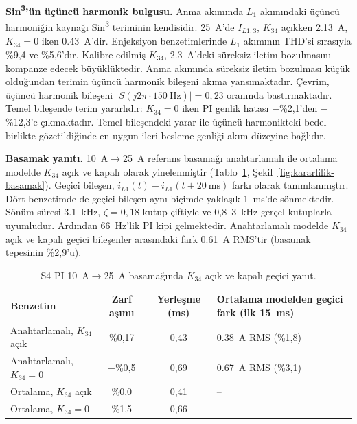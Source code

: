 \textbf{Sin\textsuperscript{3}'ün üçüncü harmonik bulgusu.} Anma akımında $L_1$ akımındaki üçüncü harmoniğin kaynağı Sin\textsuperscript{3} teriminin kendisidir. \SI{25}{\ampere}'de $I_{L1,3}$, $K_{34}$ açıkken \SI{2.13}{\ampere}, $K_{34}=0$ iken \SI{0.43}{\ampere}'dir. Enjeksiyon benzetimlerinde $L_1$ akımının THD'si sırasıyla \%9,4 ve \%5,6'dır. Kalibre edilmiş $K_{34}$, \SI{2.3}{\ampere}'deki süreksiz iletim bozulmasını kompanze edecek büyüklüktedir. Anma akımında süreksiz iletim bozulması küçük olduğundan terimin üçüncü harmonik bileşeni akıma yansımaktadır. Çevrim, üçüncü harmonik bileşeni $|S(j2\pi\cdot\SI{150}{\hertz})|=0{,}23$ oranında bastırmaktadır. Temel bileşende terim yararlıdır: $K_{34}=0$ iken PI genlik hatası $-$\%2,1'den $-$\%12,3'e çıkmaktadır. Temel bileşendeki yarar ile üçüncü harmonikteki bedel birlikte gözetildiğinde en uygun ileri besleme genliği akım düzeyine bağlıdır.

\textbf{Basamak yanıtı.} \SI{10}{\ampere}$\rightarrow$\SI{25}{\ampere} referans basamağı anahtarlamalı ile ortalama modelde $K_{34}$ açık ve kapalı olarak yinelenmiştir (Tablo~\ref{tab:kararlilik-basamak}, Şekil~\ref{fig:kararlilik-basamak}). Geçici bileşen, $i_{L1}(t)-i_{L1}(t+\SI{20}{\milli\second})$ farkı olarak tanımlanmıştır. Dört benzetimde de geçici bileşen aynı biçimde yaklaşık \SI{1}{\milli\second}'de sönmektedir. Sönüm süresi \SI{3.1}{\kilo\hertz}, $\zeta=0{,}18$ kutup çiftiyle ve 0,8--\SI{3}{\kilo\hertz} gerçel kutuplarla uyumludur. Ardından \SI{66}{\hertz}'lik PI kipi gelmektedir. Anahtarlamalı modelde $K_{34}$ açık ve kapalı geçici bileşenler arasındaki fark \SI{0.61}{\ampere} RMS'tir (basamak tepesinin \%2,9'u).

\begin{table}[H]
  \centering
  \caption{S4 PI \SI{10}{\ampere}$\rightarrow$\SI{25}{\ampere} basamağında $K_{34}$ açık ve kapalı geçici yanıt.}
  \label{tab:kararlilik-basamak}
  \small
  \begin{tabularx}{\textwidth}{@{}X c c >{\raggedright\arraybackslash}p{}@{}}
    \toprule
    Benzetim & Zarf aşımı & Yerleşme (ms) & Ortalama modelden geçici fark (ilk \SI{15}{\milli\second}) \\
    \midrule
    Anahtarlamalı, $K_{34}$ açık & \%0,17 & 0,43 & \SI{0.38}{\ampere} RMS (\%1,8) \\
    Anahtarlamalı, $K_{34}=0$    & $-$\%0,5 & 0,69 & \SI{0.67}{\ampere} RMS (\%3,1) \\
    Ortalama, $K_{34}$ açık      & \%0,0 & 0,41 & -- \\
    Ortalama, $K_{34}=0$         & \%1,5 & 0,66 & -- \\
    \bottomrule
  \end{tabularx}
\end{table}

